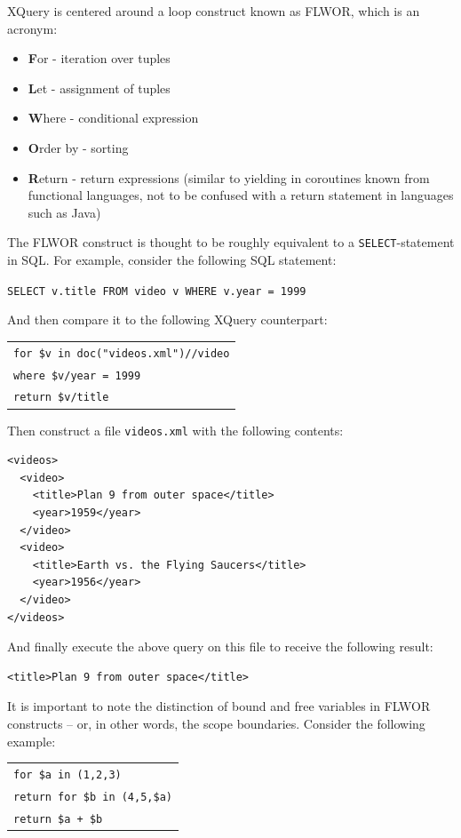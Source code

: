 XQuery is centered around a loop construct known as FLWOR, which is an acronym:
\begin{itemize}
  \item \textbf{F}or - iteration over tuples
  \item \textbf{L}et - assignment of tuples
  \item \textbf{W}here - conditional expression
  \item \textbf{O}rder by - sorting 
  \item \textbf{R}eturn - return expressions (similar to yielding in coroutines
  known from functional languages, not to be confused with a return statement
  in languages such as Java)
\end{itemize}
The FLWOR construct is thought to be roughly equivalent to a
\texttt{SELECT}-statement in SQL. For example, consider the following SQL
statement: 
\begin{center}
\verb!SELECT v.title FROM video v WHERE v.year = 1999!
\end{center}
And then compare it to the following XQuery counterpart:
\begin{center}
\begin{tabular}{l}
\texttt{for \$v in doc("videos.xml")//video} \\
\texttt{where \$v/year = 1999}\\
\texttt{return \$v/title}\\
\end{tabular}
\end{center}
Then construct a file \texttt{videos.xml} with the following contents:
\begin{center}
\begin{minipage}[h]{9.5cm}
\begin{verbatim}
<videos>
  <video>
    <title>Plan 9 from outer space</title>
    <year>1959</year>
  </video>
  <video>
    <title>Earth vs. the Flying Saucers</title>
    <year>1956</year>
  </video>
</videos>
\end{verbatim}
\end{minipage}
\end{center}
And finally execute the above query on this file to receive the following
result:
\begin{center}
\begin{minipage}[h]{7.5cm}
\begin{verbatim}
<title>Plan 9 from outer space</title>
\end{verbatim}
\end{minipage}
\end{center}
It is important to note the distinction of bound and free variables in FLWOR
constructs -- or, in other words, the scope boundaries. Consider the following
example:
\begin{center}
\begin{tabular}{l}
\texttt{for \$a in (1,2,3)} \\ \quad
  \texttt{return for \$b in (4,5,\$a)}\\ \quad\quad
    \texttt{return \$a + \$b}
\end{tabular}
\end{center}

